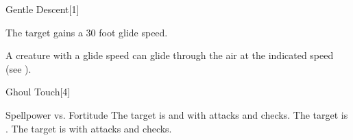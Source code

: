 \begin{spellsection}{Gentle Descent}[1]
    \begin{spellheader}
    \end{spellheader}
    \begin{spellcontent}
        \begin{spelltargetinginfo}
        \end{spelltargetinginfo}
        \begin{spelleffects}
            \spelleffect The target gains a 30 foot glide speed.
            \spelldur \durshort
        \end{spelleffects}
    \end{spellcontent}
    \begin{spellfooter}
        \spellnotes A creature with a glide speed can glide through the air at the indicated speed (see ).
        \miscastrandom
    \end{spellfooter}
    \begin{spellaugments}
    \end{spellaugments}
\end{spellsection}

\begin{spellsection}{Ghoul Touch}[4]
    \begin{spellheader}
    \end{spellheader}
    \begin{spellcontent}
        \begin{spelltargetinginfo}
        \end{spelltargetinginfo}
        \begin{spelleffects}
            \begin{spellattack}{Spellpower vs. Fortitude}
                \spellsuccess The target is \staggered and \impaired with attacks and checks.
                \spellcritical The target is \paralyzed.
                \spellfailure The target is \impaired with attacks and checks.
            \end{spellattack}
            \spelldur \durbrief
        \end{spelleffects}
    \end{spellcontent}
    \begin{spellfooter}
        \miscastrandom
    \end{spellfooter}
    \begin{spellaugments}
    \end{spellaugments}
\end{spellsection}

